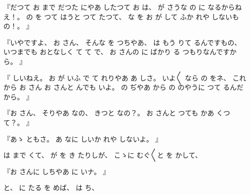 %
『だつて
お
まで
だつた
にやあ
したつて
お
は、
%
が
さうな
の
に
なるからねえ！。
%
の
を
つて
はうと
つて
たつて、
%
な
を%
お
が
して
ふか
れや
しないもの！。
』

%
『いやですよ、
%
お
さん、
%
そんな
を
つちやあ、
%
は
もう
りて
るんですもの、
%
いつまでも
おとなしく
て
て
で、
%
お
さんの
に
ばかり
る
つもりなんですから。
』

%
『
しいねえ。
%
お
が
いふ
で
て
れりやあ
あ
しさ。
%
いよ〳〵
なら
の
をネ、
%
これから
お
さん
お
さんと
んでも
いよ。
%
の
ぢやあ
から
の
のやうに
つて
るんだから。
』

%
『お
さん、
%
そりやあ
なの、
%
きつと
なの？。
%
お
さんと
つても
かあ
くつて？。
』

%
『あゝ
ともさ。
%
あ
なに
しいか
れや
しないよ。
』

%
は
まで
くて、
%
が
を
き
たりしが、
%
こゝに
むぐ〳〵と
を
かして、

%
『お
さんに
しちやあ
に
いナ。
』

%
と、
%
に
たる
を
めば、
%
は
ち、

